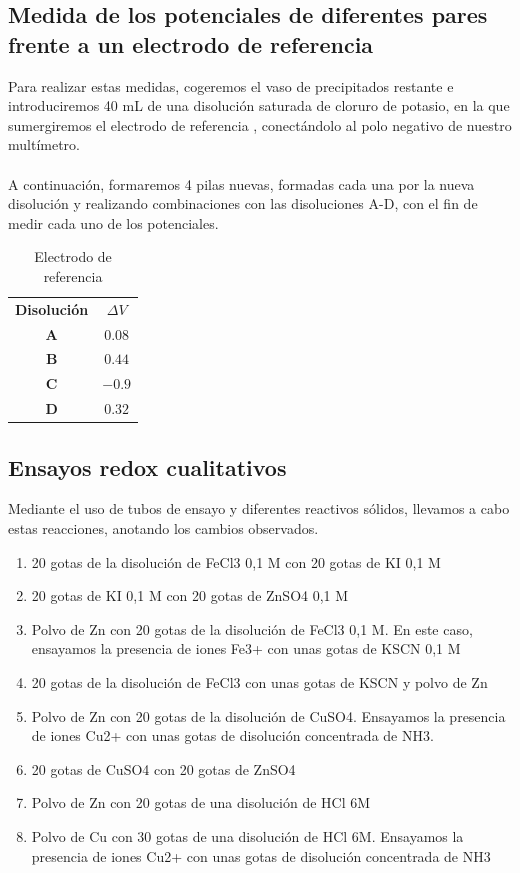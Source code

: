 \subsection{Medida de los potenciales de diferentes pares frente a un electrodo de
referencia}
\noindent Para realizar estas medidas, cogeremos el vaso de precipitados restante e
introduciremos 40 mL de una disolución saturada de cloruro de potasio, en la que
sumergiremos el electrodo de referencia , conectándolo al polo negativo
de nuestro multímetro.\\\\
A continuación, formaremos 4 pilas nuevas, formadas cada una por la nueva
disolución y realizando combinaciones con las disoluciones A-D, con el fin de
medir cada uno de los potenciales.

\begin{table}[H]
\centering
\begin{tabular}{cc}
\rowcolor[HTML]{9698ED} 
\textbf{Disolución} & \textbf{$\Delta V$} \\
\rowcolor[HTML]{DAE8FC} 
\textbf{A} & $0.08$ \\
\textbf{B} & $0.44$ \\
\rowcolor[HTML]{DAE8FC} 
\textbf{C} & $-0.9$ \\
\textbf{D} & $0.32$
\end{tabular}
\caption{Electrodo de referencia}
\label{referencia}
\end{table}

\subsection{Ensayos redox cualitativos}
\noindent Mediante el uso de tubos de ensayo y diferentes reactivos sólidos, llevamos a cabo estas reacciones, anotando los cambios observados.
\begin{enumerate}
\item 20 gotas de la disolución de FeCl3 0,1 M con 20 gotas de KI 0,1 M
\item 20 gotas de KI 0,1 M con 20 gotas de ZnSO4 0,1 M
\item Polvo de Zn con 20 gotas de la disolución de FeCl3 0,1 M. En este caso, ensayamos la presencia de iones Fe3+ con unas gotas de KSCN 0,1 M
\item 20 gotas de la disolución de FeCl3 con unas gotas de KSCN y polvo de Zn
\item Polvo de Zn con 20 gotas de la disolución de CuSO4. Ensayamos la presencia de iones Cu2+ con unas gotas de disolución concentrada de NH3.
\item 20 gotas de CuSO4 con 20 gotas de ZnSO4
\item Polvo de Zn con 20 gotas de una disolución de HCl 6M
\item Polvo de Cu con 30 gotas de una disolución de HCl 6M. Ensayamos la presencia de iones Cu2+ con unas gotas de disolución concentrada de NH3
\end{enumerate}


